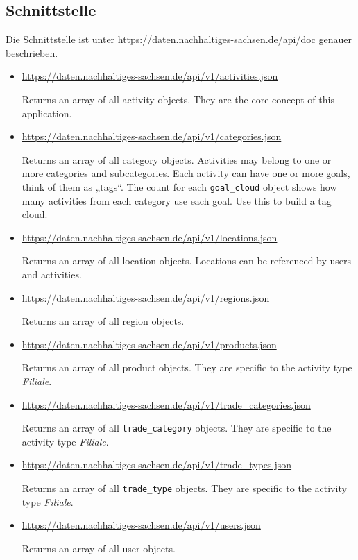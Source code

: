 \documentclass[a4paper,11pt]{article}
\begin{document}
\subsection{Schnittstelle}

Die Schnittstelle ist unter
\url{https://daten.nachhaltiges-sachsen.de/api/doc} genauer beschrieben.

\begin{itemize}
\item \url{https://daten.nachhaltiges-sachsen.de/api/v1/activities.json}

Returns an array of all activity objects. They are the core concept of this
application.

\item
  \url{https://daten.nachhaltiges-sachsen.de/api/v1/categories.json} 

Returns an array of all category objects. Activities may belong to one or more
categories and subcategories. Each activity can have one or more goals, think
of them as „tags“. The count for each \texttt{goal\_cloud} object shows how
many activities from each category use each goal. Use this to build a tag
cloud.

\item \url{https://daten.nachhaltiges-sachsen.de/api/v1/locations.json} 

Returns an array of all location objects. Locations can be referenced by users
and activities.

\item \url{https://daten.nachhaltiges-sachsen.de/api/v1/regions.json}

Returns an array of all region objects.
 
\item \url{https://daten.nachhaltiges-sachsen.de/api/v1/products.json}

Returns an array of all product objects. They are specific to the activity
type \emph{Filiale}.

\item
  \url{https://daten.nachhaltiges-sachsen.de/api/v1/trade_categories.json} 

Returns an array of all \texttt{trade\_category} objects. They are specific to
the activity type \emph{Filiale}.

\item
  \url{https://daten.nachhaltiges-sachsen.de/api/v1/trade_types.json} 

Returns an array of all \texttt{trade\_type} objects. They are specific to the
activity type \emph{Filiale}.

\item \url{https://daten.nachhaltiges-sachsen.de/api/v1/users.json}

Returns an array of all user objects. 
\end{itemize}
\end{document}
